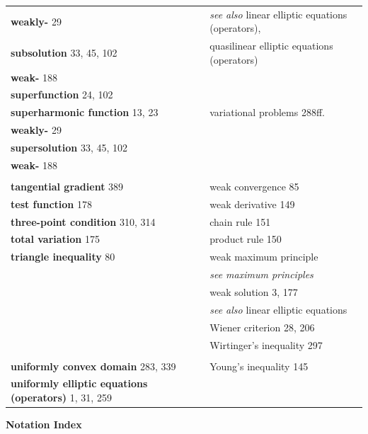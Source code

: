 \noindent
\begin{tabular}{@{}p{}p{}@{}}
\textbf{weakly-} 29 & \emph{see also} linear elliptic equations (operators),\\
\textbf{subsolution} 33, 45, 102 & quasilinear elliptic equations (operators)\\
\textbf{weak-} 188 & \\
\textbf{superfunction} 24, 102 & \\
\textbf{superharmonic function} 13, 23 & variational problems 288ff.\\
\textbf{weakly-} 29 & \\
\textbf{supersolution} 33, 45, 102 & \\
\textbf{weak-} 188 & \\
 & \\
\textbf{tangential gradient} 389 & weak convergence 85\\
\textbf{test function} 178 & weak derivative 149\\
\textbf{three-point condition} 310, 314 & \hspace{1em}chain rule 151\\
\textbf{total variation} 175 & \hspace{1em}product rule 150\\
\textbf{triangle inequality} 80 & weak maximum principle\\
 & \hspace{1em}\emph{see maximum principles}\\
 & weak solution 3, 177\\
 & \hspace{1em}\emph{see also} linear elliptic equations\\
 & Wiener criterion 28, 206\\
 & Wirtinger's inequality 297\\
 & \\
\textbf{uniformly convex domain} 283, 339 & Young's inequality 145\\
\textbf{uniformly elliptic equations (operators)} 1, 31, 259 & \\
\end{tabular}

\begin{center}
\textbf{Notation Index}
\end{center}


